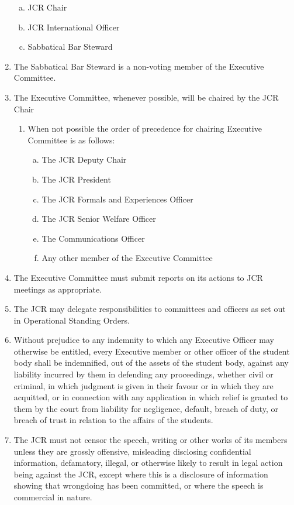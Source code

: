 \documentclass[12pt]{article}  %
\begin{document}
\begin{enumerate}
\begin{enumerate}[(a)]
        \item JCR Chair
        \item JCR International Officer
        \item Sabbatical Bar Steward
    \end{enumerate}
    \item The Sabbatical Bar Steward is a non-voting member of the Executive Committee.
    \item The Executive Committee, whenever possible, will be chaired by the JCR Chair
    \begin{enumerate}
        \item When not possible the order of precedence for chairing Executive Committee is as follows:
        \begin{enumerate}[(a)]
            \item The JCR Deputy Chair
            \item The JCR President
            \item The JCR Formals and Experiences Officer
            \item The JCR Senior Welfare Officer
            \item The Communications Officer
            \item Any other member of the Executive Committee
        \end{enumerate}
    \end{enumerate}
    \item The Executive Committee must submit reports on its actions to JCR meetings as appropriate.
    \item The JCR may delegate responsibilities to committees and officers as set out in Operational Standing Orders.
    \item Without prejudice to any indemnity to which any Executive Officer may otherwise be entitled, every Executive member or other officer of the student body shall be indemnified, out of the assets of the student body, against any liability incurred by them in defending any proceedings, whether civil or criminal, in which judgment is given in their favour or in which they are acquitted, or in connection with any application in which relief is granted to them by the court from liability for negligence, default, breach of duty, or breach of trust in relation to the affairs of the students.
    \item The JCR must not censor the speech, writing or other works of its members unless they are grossly offensive, misleading disclosing confidential information, defamatory, illegal, or otherwise likely to result in legal action being against the JCR, except where this is a disclosure of information showing that wrongdoing has been committed, or where the speech is commercial in nature.
\end{enumerate}
\newpage
\end{document}
